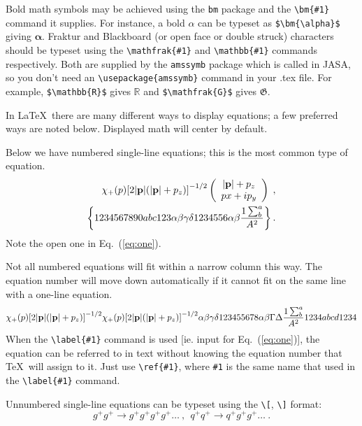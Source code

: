 \documentclass[preprint]{JASA}
\begin{document}
Bold math
symbols may be achieved using the \verb+bm+ package and the
\verb+\bm{#1}+ command it supplies. For instance, a bold $\alpha$ can
be typeset as \verb+$\bm{\alpha}$+ giving $\bm{\alpha}$. Fraktur and
Blackboard (or open face or double struck) characters should be
typeset using the \verb+\mathfrak{#1}+ and \verb+\mathbb{#1}+ commands
respectively. Both are supplied by the \texttt{amssymb} package which
is called in JASA, so you don't need an \verb+\usepackage{amssymb}+
command in your .tex file. For
example, \verb+$\mathbb{R}$+ gives $\mathbb{R}$ and
\verb+$\mathfrak{G}$+ gives $\mathfrak{G}$.

In \LaTeX\ there are many different ways to display equations; a
few preferred ways are noted below. Displayed math will center by
default. 

Below we have numbered single-line equations; this is the most common
type of equation.
\begin{eqnarray}
\chi_+(p){\bf [}2|{\bf p}|(|{\bf p}|+p_z){\bf ]}^{-1/2}
\left(
\begin{array}{c}
|{\bf p}|+p_z\\
px+ip_y
\end{array}\right)\;,
\\
\left\{%
 1234567890abc123\alpha\beta\gamma\delta1234556\alpha\beta
 \frac{1\sum^{a}_{b}}{A^2}%
\right\}%
\label{eq:one}.
\end{eqnarray}
Note the open one in Eq.~(\ref{eq:one}).

Not all numbered equations will fit within a narrow column this
way. The equation number will move down automatically if it cannot fit
on the same line with a one-line equation.
\begin{equation}
\chi_+(p){\bf [}2|{\bf p}|(|{\bf p}|+p_z){\bf ]}^{-1/2}
\chi_+(p){\bf [}2|{\bf p}|(|{\bf p}|+p_z){\bf ]}^{-1/2}
\alpha\beta\gamma\delta123455678\alpha\beta\Gamma\Delta
 \frac{1\sum^{a}_{b}}{A^2}1234abcd1234%
\end{equation}
When the \verb+\label{#1}+ command is used [ie. input for
Eq.~(\ref{eq:one})], the equation can be referred to in text without
knowing the equation number that \TeX\ will assign to it. Just
use \verb+\ref{#1}+, where \verb+#1+ is the same name that used in
the \verb+\label{#1}+ command.

Unnumbered single-line equations can be typeset
using the \verb+\[+, \verb+\]+ format:
\[g^+g^+ \rightarrow g^+g^+g^+g^+ \dots ~,~~q^+q^+\rightarrow
q^+g^+g^+ \dots ~. \]
\end{document}
